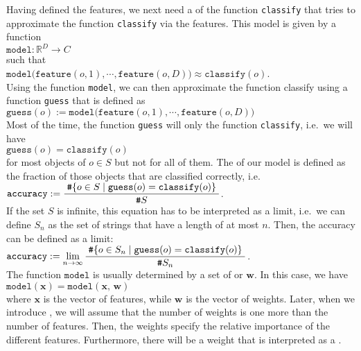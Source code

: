 Having defined the features, we next need a  of the function \texttt{classify} that tries to approximate the
function \texttt{classify} via the features.  This model is given by a function
\\[0.2cm]
\hspace*{1.3cm}
$\mathtt{model}: \mathbb{R}^D \rightarrow C$
\\[0.2cm]
such that
\\[0.2cm]
\hspace*{1.3cm}
$\mathtt{model}\bigl(\mathtt{feature}(o,1), \cdots, \mathtt{feature}(o,D)\bigr) \approx \mathtt{classify}(o)$.
\\[0.2cm]
Using the function \texttt{model}, we can then approximate the function classify using a function \texttt{guess} that is
defined as
\\[0.2cm]
\hspace*{1.3cm}
$\mathtt{guess}(o) := \mathtt{model}\bigl(\mathtt{feature}(o,1), \cdots, \mathtt{feature}(o,D)\bigr)$
\\[0.2cm]
Most of the time, the function \texttt{guess} will only  the function \texttt{classify}, i.e.~we will have
\\[0.2cm]
\hspace*{1.3cm}
$\mathtt{guess}(o) = \mathtt{classify}(o)$
\\[0.2cm]
for most objects of $o \in S$ but not for all of them.  The  of our model is defined as the fraction
of those objects that are classified correctly, i.e.~
\\[0.2cm]
\hspace*{1.3cm}
$\displaystyle \mathtt{accuracy} := \frac{\;\texttt{\#} \{ o \in S \mid \mathtt{guess}(o) = \mathtt{classify}(o)\}\;}{\texttt{\#} S}$.
\\[0.2cm]
If the set $S$ is infinite, this equation has to be interpreted as a limit, i.e.~we can define
$S_n$ as the set of strings that have a length of at most $n$.  Then, the accuracy can be defined as a limit:
\\[0.2cm]
\hspace*{1.3cm}
$\displaystyle \mathtt{accuracy} := \lim\limits_{n\rightarrow\infty}\frac{\;\texttt{\#} \{ o \in S_n \mid \mathtt{guess}(o) = \mathtt{classify}(o)\}\;}{\texttt{\#} S_n}$.
\\[0.2cm]
The function $\mathtt{model}$ is usually determined by a set of  or  $\mathbf{w}$. In
this case, we have
\\[0.2cm]
\hspace*{1.3cm}
$\mathtt{model}(\mathbf{x}) = \mathtt{model}(\mathbf{x},\,\mathbf{w})$
\\[0.2cm]
where $\mathbf{x}$ is the vector of features, while $\mathbf{w}$ is the vector of weights.  Later, when we
introduce , we will assume that the number of weights is one more than the number of
features.  Then, the weights specify the relative importance of the different features. Furthermore, there will
be a weight that is interpreted as a .

